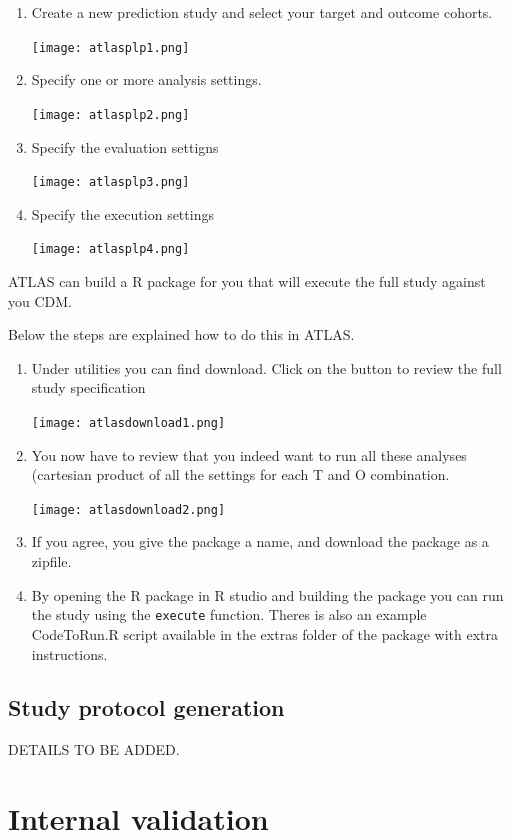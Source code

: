 \documentclass[]{article}
\begin{document}
\begin{enumerate}
\def\labelenumi{\arabic{enumi})}
\item
  Create a new prediction study and select your target and outcome
  cohorts.

  \texttt{[image: atlasplp1.png]}
\item
  Specify one or more analysis settings.

  \texttt{[image: atlasplp2.png]}

  \newpage
\item
  Specify the evaluation settigns

  \texttt{[image: atlasplp3.png]}
\item
  Specify the execution settings

  \texttt{[image: atlasplp4.png]}
\end{enumerate}

ATLAS can build a R package for you that will execute the full study
against you CDM.

Below the steps are explained how to do this in ATLAS.

\begin{enumerate}
\def\labelenumi{\arabic{enumi})}
\item
  Under utilities you can find download. Click on the button to review
  the full study specification

  \texttt{[image: atlasdownload1.png]}
\item
  You now have to review that you indeed want to run all these analyses
  (cartesian product of all the settings for each T and O combination.

  \texttt{[image: atlasdownload2.png]}
\item
  If you agree, you give the package a name, and download the package as
  a zipfile.
\item
  By opening the R package in R studio and building the package you can
  run the study using the \texttt{execute} function. Theres is also an
  example CodeToRun.R script available in the extras folder of the
  package with extra instructions.
\end{enumerate}

\subsection{Study protocol generation}\label{study-protocol-generation}

DETAILS TO BE ADDED.

\section{Internal validation}\label{internal-validation}
\end{document}
